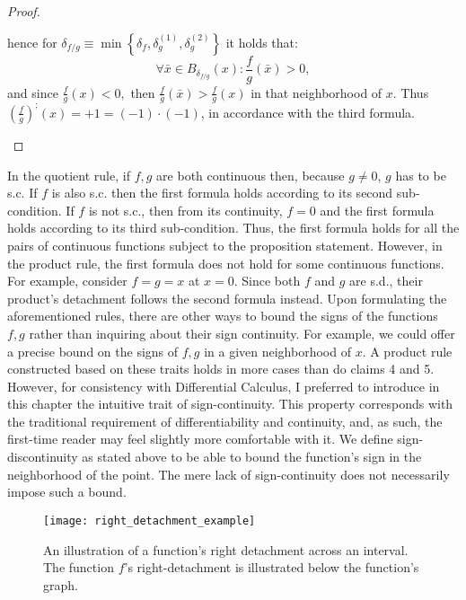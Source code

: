 \documentclass[11pt]{book}
\begin{document}
\begin{proof}
\begin{enumerate}
\begin{itemize}
hence for $\delta_{f/g}\equiv\min\left\{ \delta_{f},\delta_{g}^{\left(1\right)},\delta_{g}^{\left(2\right)}\right\} $ it holds that:
$$\forall\bar{x}\in B_{\delta_{f/g}}\left(x\right):\frac{f}{g}\left(\bar{x}\right)>0,$$
and since $\frac{f}{g}\left(x\right)<0,$ then $\frac{f}{g}\left(\bar{x}\right)>\frac{f}{g}\left(x\right)$ in that neighborhood of $x$. Thus $\left(\frac{f}{g}\right)^{;}\left(x\right)=+1=\left(-1\right)\cdot\left(-1\right)$, in accordance with the third formula.
\end{itemize}
\end{enumerate}
\end{proof}

\begin{remark}In the quotient rule, if $f,g$ are both continuous then, because $g\neq0$, $g$ has to be s.c. If $f$ is also s.c. then the first formula holds according to its second sub-condition. If $f$ is not s.c., then from its continuity, $f=0$ and the first formula holds according to its third sub-condition. Thus, the first formula holds for all the pairs of continuous functions subject to the proposition statement. However, in the product rule, the first formula does not hold for some continuous functions. For example, consider $f=g=x$ at $x=0$. Since both $f$ and $g$ are s.d., their product's detachment follows the second formula instead.
Upon formulating the aforementioned rules, there are other ways to bound the signs of the functions $f,g$ rather than inquiring about their sign continuity. For example, we could offer a precise bound on the signs of $f,g$ in a given neighborhood of $x$. A product rule constructed based on these traits holds in more cases than do claims 4 and 5. However, for consistency with Differential Calculus, I preferred to introduce in this chapter the intuitive trait of sign-continuity. This property corresponds with the traditional requirement of differentiability and continuity, and, as such, the first-time reader may feel slightly more comfortable with it.
We define sign-discontinuity as stated above to be able to bound the function's sign in the neighborhood of the point. The mere lack of sign-continuity does not necessarily impose such a bound.
\end{remark}

\begin{figure}[h!]
\texttt{[image: right\_detachment\_example]}
\caption{An illustration of a function's right detachment across an interval. The function $f$'s right-detachment is illustrated below the function's graph.}
\end{figure}
\end{document}
